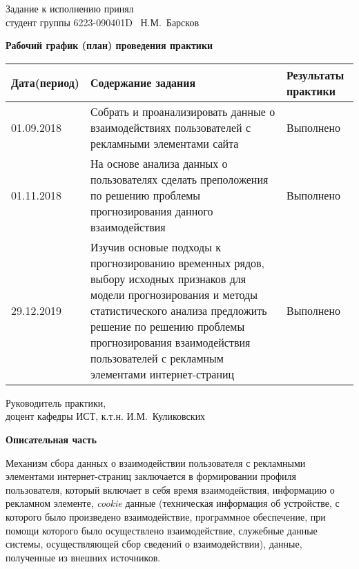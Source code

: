 \documentclass[a4paper, 12pt]{extreport}
\begin{document}
    \noindent Задание к исполнению принял \\
    студент группы 6223-090401D \hrulefill\mbox{ Н.М. Барсков}
    \newpage
    \begin{center}
        \textbf{Рабочий график (план) проведения практики}
    \end{center}
    \noindent\begin{longtable}{|m{4.5cm}|m{6.5cm}|m{4.5cm}|}
                 \hline
                 Дата(период) &
                 Содержание задания &
                 Результаты практики \\
                 \hline
                 01.09.2018
                 & Собрать и проанализировать данные о взаимодействиях пользователей с рекламными элементами сайта
                 & Выполнено \\
                 \hline
                 01.11.2018
                 & На основе анализа данных о пользователях сделать преположения по решению проблемы прогнозирования
                 данного взаимодействия
                 & Выполнено \\
                 \hline
                 29.12.2019
                 & Изучив основые подходы к прогнозированию временных рядов, выбору исходных признаков для модели
                 прогнозирования и методы статистического анализа предложить решение по решению проблемы
                 прогнозирования взаимодействия пользователей с рекламным элементами интернет-страниц
                 & Выполнено \\
                 \hline
    \end{longtable}

    \noindent Руководитель практики, \\
    доцент кафедры ИСТ, к.т.н. \hrulefill \mbox{И.М. Куликовских}

    \newpage
    \begin{center}
        \textbf{Описательная часть}
    \end{center}

    Механизм сбора данных о взаимодействии пользователя с рекламными элементами интернет-страниц заключается в
    формировании профиля пользователя, который включает в себя время взаимодействия, информацию о рекламном элементе,
    \textit{cookie} данные (техническая информация об устройстве, с которого было произведено взаимодействие,
    программное обеспечение, при помощи которого было осуществлено взаимодействие, служебные данные системы,
    осуществляющей сбор сведений о взаимодействии), данные, полученные из внешних источников.
\end{document}
